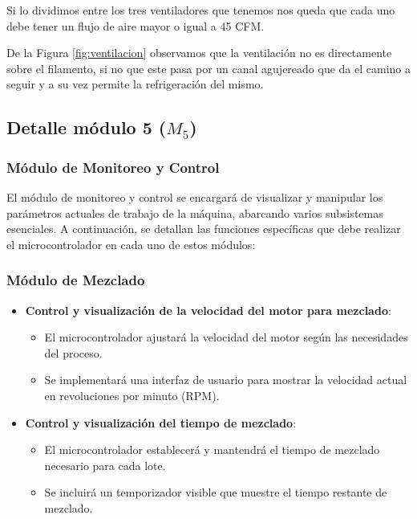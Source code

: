 \documentclass[14pt,oneside]{extarticle} %
\begin{document}
Si lo dividimos entre los tres ventiladores que tenemos nos queda que cada uno debe tener un flujo de aire mayor o igual a 45 CFM.

De la Figura \ref{fig:ventilacion} observamos que la ventilación no es directamente sobre el filamento, si no que este pasa por un canal agujereado que da el camino a seguir y a su vez permite la refrigeración del mismo.


\subsection{Detalle módulo 5 ($M_5$)}

\subsubsection{Módulo de Monitoreo y Control}

El módulo de monitoreo y control se encargará de visualizar y manipular los parámetros actuales de trabajo de la máquina, abarcando varios subsistemas esenciales. A continuación, se detallan las funciones específicas que debe realizar el microcontrolador en cada uno de estos módulos:

\subsubsection{Módulo de Mezclado}

\begin{itemize}
    \item \textbf{Control y visualización de la velocidad del motor para mezclado}: 
    \begin{itemize}
        \item El microcontrolador ajustará la velocidad del motor según las necesidades del proceso.
        \item Se implementará una interfaz de usuario para mostrar la velocidad actual en revoluciones por minuto (RPM).
    \end{itemize}
    \item \textbf{Control y visualización del tiempo de mezclado}:
    \begin{itemize}
        \item El microcontrolador establecerá y mantendrá el tiempo de mezclado necesario para cada lote.
        \item Se incluirá un temporizador visible que muestre el tiempo restante de mezclado.
    \end{itemize}
\end{itemize}
\end{document}
